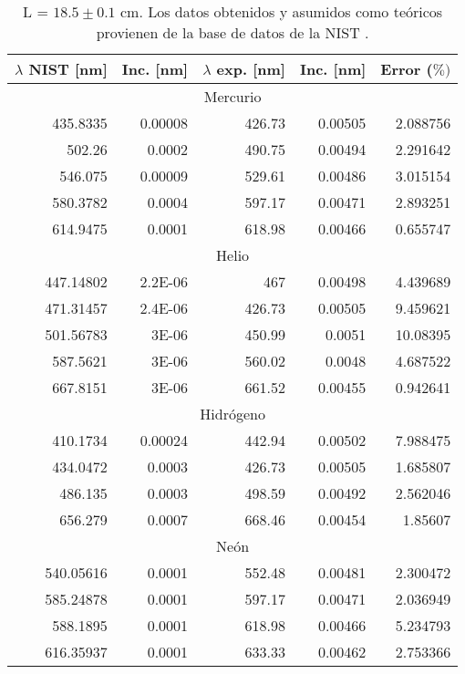 \documentclass[%
 reprint,
 amsmath,amssymb,
 aps,
]{revtex4-1}
\begin{document}
\begin{table}[H]
  \centering
  \caption{L = $18.5 \pm 0.1$ cm. Los datos obtenidos y asumidos como teóricos provienen de la base de datos de la NIST \cite{NIST}.}
    \begin{tabular}{|r|r|r|r|r|}
    \hline
    \multicolumn{1}{|l|}{$\lambda$ NIST [nm]} & \multicolumn{1}{l|}{Inc. [nm]} & \multicolumn{1}{l|}{$\lambda$ exp. [nm]} & \multicolumn{1}{l|}{Inc. [nm]} & \multicolumn{1}{l|}{Error ($\%)$} \\
    \hline
    \multicolumn{5}{|c|}{Mercurio} \\
    \hline
    435.8335 & 0.00008 & 426.73 & 0.00505 & 2.088756 \\
    502.26 & 0.0002 & 490.75 & 0.00494 & 2.291642 \\
    546.075 & 0.00009 & 529.61 & 0.00486 & 3.015154 \\
    580.3782 & 0.0004 & 597.17 & 0.00471 & 2.893251 \\
    614.9475 & 0.0001 & 618.98 & 0.00466 & 0.655747 \\
    \hline
    \multicolumn{5}{|c|}{Helio} \\
    \hline
    447.14802 & 2.2E-06 & 467   & 0.00498 & 4.439689 \\
    471.31457 & 2.4E-06 & 426.73 & 0.00505 & 9.459621 \\
    501.56783 & 3E-06 & 450.99 & 0.0051 & 10.08395 \\
    587.5621 & 3E-06 & 560.02 & 0.0048 & 4.687522 \\
    667.8151 & 3E-06 & 661.52 & 0.00455 & 0.942641 \\
    \hline
    \multicolumn{5}{|c|}{Hidrógeno} \\
    \hline
    410.1734 & 0.00024 & 442.94 & 0.00502 & 7.988475 \\
    434.0472 & 0.0003 & 426.73 & 0.00505 & 1.685807 \\
    486.135 & 0.0003 & 498.59 & 0.00492 & 2.562046 \\
    656.279 & 0.0007 & 668.46 & 0.00454 & 1.85607 \\
    \hline
    \multicolumn{5}{|c|}{Neón} \\
    \hline
    540.05616 & 0.0001 & 552.48 & 0.00481 & 2.300472 \\
    585.24878 & 0.0001 & 597.17 & 0.00471 & 2.036949 \\
    588.1895 & 0.0001 & 618.98 & 0.00466 & 5.234793 \\
    616.35937 & 0.0001 & 633.33 & 0.00462 & 2.753366 \\

\end{tabular}
\end{table}
\end{document}

